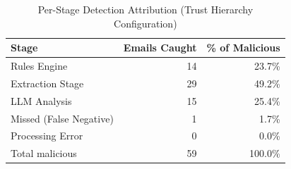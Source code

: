 \begin{table}[h]
\centering
\caption{Per-Stage Detection Attribution (Trust Hierarchy Configuration)}
\label{tab:e6_stage_attribution}
\begin{tabular}{l r r}
\hline
Stage & Emails Caught & \% of Malicious \\
\hline
Rules Engine & 14 & 23.7\% \\
Extraction Stage & 29 & 49.2\% \\
LLM Analysis & 15 & 25.4\% \\
Missed (False Negative) & 1 & 1.7\% \\
Processing Error & 0 & 0.0\% \\
\hline
Total malicious & 59 & 100.0\% \\
\hline
\end{tabular}
\end{table}
